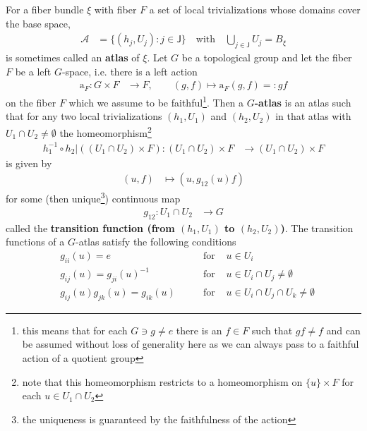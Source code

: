 For a fiber bundle $\xi$ with fiber $F$ a set of local trivializations whose domains cover the base space,
\begin{align*}
  \mathcal{A}
  &=
  \lbrace
    (h_{j},U_{j})
    \colon
    j
    \in
    \mathsf{J}
  \rbrace
  \quad
  \text{with}
  \quad
  \bigcup_{j \in \mathsf{J}}
  U_{j}
  =
  B_{\xi}
\end{align*}
is sometimes called an \textbf{atlas} of $\xi$. Let $G$ be a topological group and let the fiber $F$ be a left $G$-space, i.e. there is a left action
\begin{align*}
  \mathrm{a}_{F}
  \colon
  G
  \times
  F
  &\to
  F
  ,\qquad
  (g,f)
  \mapsto
  \mathrm{a}_{F}(g,f)
  =:
  gf
\end{align*}
on the fiber $F$ which we assume to be faithful\footnote{this means that for each $G \ni g \neq e$ there is an $f \in F$ such that $gf \neq f$ and can be assumed without loss of generality here as we can always pass to a faithful action of a quotient group}. Then a \textbf{$G$-atlas} is an atlas such that for any two local trivializations $(h_{1},U_{1})$ and $(h_{2},U_{2})$ in that atlas with $U_{1} \cap U_{2} \neq \emptyset$ the homeomorphism\footnote{note that this homeomorphism restricts to a homeomorphism on $\lbrace u \rbrace \times F$ for each $u \in U_{1} \cap U_{2}$}
\begin{align*}
  h_{1}^{-1}
  \circ
  h_{2}
  \vert
  \left(
    (U_{1} \cap U_{2})
    \times
    F
  \right)
  \colon
  (U_{1} \cap U_{2})
  \times
  F
  &\to
  (U_{1} \cap U_{2})
  \times
  F
\end{align*}
is given by
\begin{align*}
  (u,f)
  &\mapsto
  \left(
    u
    ,
    g_{12}(u)
    f
  \right)
\end{align*}
for some (then unique\footnote{the uniqueness is guaranteed by the faithfulness of the action}) continuous map
\begin{align*}
  g_{12}
  \colon
  U_{1} \cap U_{2}
  &\to
  G
\end{align*}
called the \textbf{transition function (from $(h_{1},U_{1})$ to $(h_{2},U_{2})$)}. The transition functions of a $G$-atlas satisfy the following conditions
\begin{equation*}
\begin{aligned}
  &
  g_{ii}(u)
  =
  e
  \qquad
  &\text{for }&
  u
  \in
  U_{i}
  \\
  &
  g_{ij}(u)
  =
  g_{ji}(u)^{-1}
  \qquad
  &\text{for }&
  u
  \in
  U_{i}
  \cap
  U_{j}
  \neq
  \emptyset
  \\
  &
  g_{ij}(u)
  g_{jk}(u)
  =
  g_{ik}(u)
  \qquad
  &\text{for }&
  u
  \in
  U_{i}
  \cap
  U_{j}
  \cap
  U_{k}
  \neq
  \emptyset
\end{aligned}
\end{equation*}
